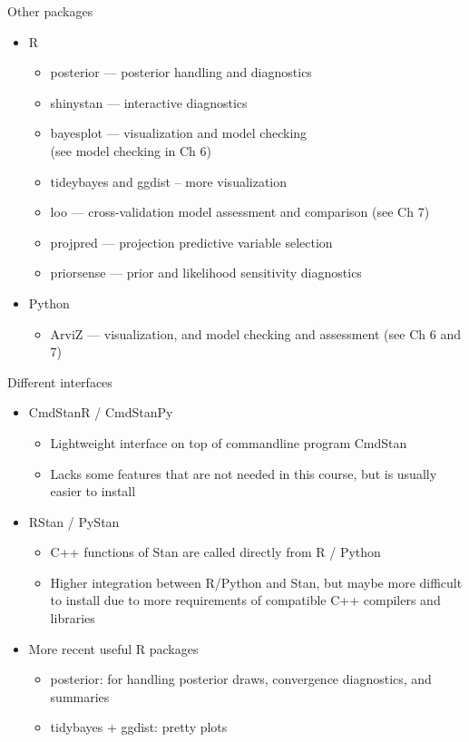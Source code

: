 \documentclass[finnish,english,t]{beamer}
\begin{document}
\begin{frame}{Other packages}

  \begin{itemize}
  \item R
    \begin{itemize}
    \item posterior --- posterior handling and diagnostics
    \item shinystan --- interactive diagnostics
    \item bayesplot --- visualization and model checking\\ (see model checking in Ch 6)
    \item tideybayes and ggdist -- more visualization
    \item loo --- cross-validation model assessment and comparison (see Ch 7)
    \item projpred --- projection predictive variable selection
    \item priorsense --- prior and likelihood sensitivity diagnostics
    \end{itemize}
    \vspace{\baselineskip}
  \item Python
    \begin{itemize}
    \item ArviZ --- visualization, and model checking and assessment (see Ch 6 and 7)
    \end{itemize}
  \end{itemize}

\end{frame} 

\begin{frame}{Different interfaces}

  \begin{itemize}
  \item CmdStanR / CmdStanPy
    \begin{itemize}
    \item Lightweight interface on top of commandline program CmdStan
    \item Lacks some features that are not needed in this course, but
      is usually easier to install
    \end{itemize}
  \item RStan / PyStan
    \begin{itemize}
    \item C++ functions of Stan are called directly from R / Python
    \item Higher integration between R/Python and Stan, but maybe more
      difficult to install due to more requirements of compatible C++
      compilers and libraries
    \end{itemize}
  \item More recent useful R packages
    \begin{itemize}
    \item posterior: for handling posterior draws, convergence diagnostics, and summaries
    \item tidybayes + ggdist: pretty plots
    \end{itemize}
  \end{itemize}

\end{frame} 
\end{document}
